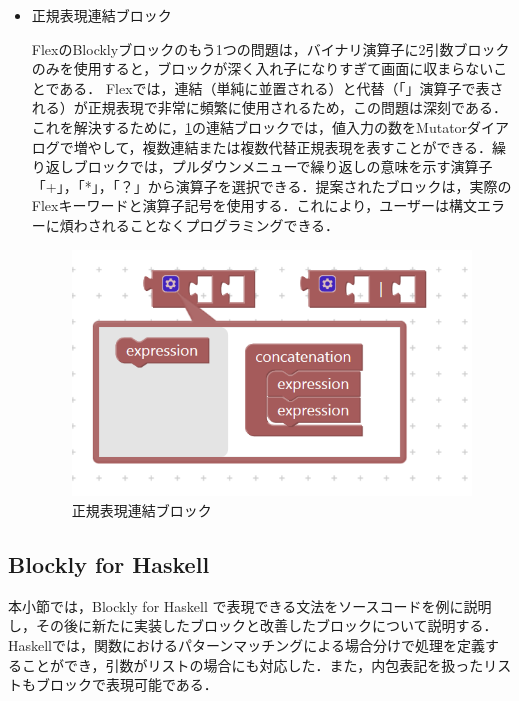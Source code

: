 \documentclass{risepaper}
\begin{document}
\begin{itemize}
\item 正規表現連結ブロック

FlexのBlocklyブロックのもう1つの問題は，バイナリ演算子に2引数ブロックのみを使用すると，ブロックが深く入れ子になりすぎて画面に収まらないことである． Flexでは，連結（単純に並置される）と代替（「\textbar」演算子で表される）が正規表現で非常に頻繁に使用されるため，この問題は深刻である．これを解決するために，\ref{fig:flex_connection_block}の連結ブロックでは，値入力の数をMutatorダイアログで増やして，複数連結または複数代替正規表現を表すことができる．繰り返しブロックでは，プルダウンメニューで繰り返しの意味を示す演算子「+」，「*」，「？」から演算子を選択できる．提案されたブロックは，実際のFlexキーワードと演算子記号を使用する．これにより，ユーザーは構文エラーに煩わされることなくプログラミングできる．

\begin{figure}[h]
\begin{center}
\includegraphics[scale=0.8]{img/flex_connection_block.png}
\caption{正規表現連結ブロック}%
\label{fig:flex_connection_block}
\end{center}%
\end{figure}%

\end{itemize} 

   \subsection{Blockly for Haskell}

本小節では，Blockly for Haskell で表現できる文法をソースコードを例に説明し，その後に新たに実装したブロックと改善したブロックについて説明する．Haskellでは，関数におけるパターンマッチングによる場合分けで処理を定義することができ，引数がリストの場合にも対応した．また，内包表記を扱ったリストもブロックで表現可能である．
\end{document}
